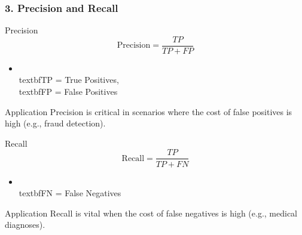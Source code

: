 \documentclass[aspectratio=169]{beamer}
\begin{document}
\begin{frame}[fragile]
    \frametitle{3. Precision and Recall}
    \begin{block}{Precision}
        \begin{equation}
        \text{Precision} = \frac{TP}{TP + FP}
        \end{equation}
        \begin{itemize}
            \item \\textbf{TP} = True Positives, \\textbf{FP} = False Positives
        \end{itemize}
        \begin{block}{Application}
            Precision is critical in scenarios where the cost of false positives is high (e.g., fraud detection).
        \end{block}
    \end{block}

    \begin{block}{Recall}
        \begin{equation}
        \text{Recall} = \frac{TP}{TP + FN}
        \end{equation}
        \begin{itemize}
            \item \\textbf{FN} = False Negatives
        \end{itemize}
        \begin{block}{Application}
            Recall is vital when the cost of false negatives is high (e.g., medical diagnoses).
        \end{block}
    \end{block}
\end{frame}
\end{document}
